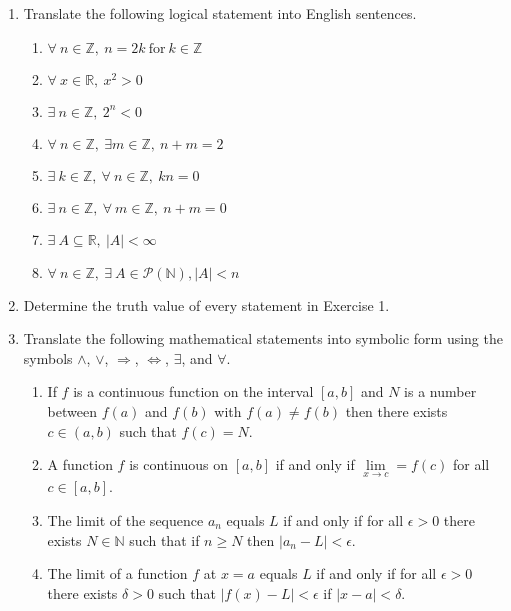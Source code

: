 \documentclass[12 pt]{article}
\newcommand{\R}{\mathbb{R}}
\newcommand{\Z}{\mathbb{Z}}
\theoremstyle{definition}
\theoremstyle{plain}
\theoremstyle{mytheorem}
\theoremstyle{myexample}
\theoremstyle{mydefinition}
\begin{document}
\begin{enumerate}
\item Translate the following logical statement into English sentences.
	\begin{enumerate} \itemsep2in
	\item $ \forall \ n \in \Z, \ n=2k \ \mbox{for} \ k \in \Z$
	\item $ \forall \ x \in \R, \ x^2 >0$
	\item $ \exists \ n \in \Z, \ 2^n<0$
	\item $ \forall \ n \in \Z, \ \exists m \in \Z, \ n+m=2$
	\item $ \exists \ k \in \Z, \ \forall \ n \in \Z, \ kn=0$
	\item $\exists \ n \in \Z, \ \forall \ m \in \Z, \ n+m = 0$
	\item $\exists \ A \subseteq \R, \ |A|< \infty$
	\item $\forall \ n \in \Z, \ \exists \ A \in \mathscr{P}(\mathbb{N}),  |A|<n$
	\end{enumerate}

\vspace{1in}

\item Determine the truth value of every statement in Exercise 1.
\item Translate the following mathematical statements into symbolic form using the symbols $ \wedge$, $\vee$, $\Rightarrow$, $\Leftrightarrow$, $\exists$, and $\forall$.

	\begin{enumerate} \itemsep3in
	\item If $f$ is a continuous function on the interval $[a,b]$ and $N$ is a number between $f(a)$ and $f(b)$ with $f(a) \neq f(b)$ then there exists $c \in (a,b)$ such that $f(c)=N$. 
	
	\item A function $f$ is continuous on $[a,b]$ if and only if $\lim\limits_{x \rightarrow c} = f(c)$ for all $c \in [a,b]$.
	
	\item The limit of the sequence $a_n$ equals $L$ if and only if for all $\epsilon >0$ there exists $N \in \mathbb{N}$ such that if $n \geq N$ then $|a_n-L| < \epsilon$.
	
	\item The limit of a function $f$ at $x=a$ equals $L$ if and only if for all $\epsilon > 0$ there exists $\delta>0$ such that $|f(x)-L|< \epsilon$ if $|x - a| < \delta$.
	\end{enumerate}

\end{enumerate}
\end{document}
